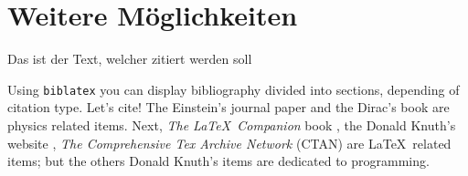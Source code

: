 \Author{\daAuthorOne}

\section{Weitere Möglichkeiten}

Das ist der Text, welcher zitiert werden soll \autocite[399]{einstein}

Using \texttt{biblatex} you can display bibliography divided into sections, 
depending of citation type. 
Let's cite! The Einstein's journal paper \autocite{einstein} and the Dirac's 
book \autocite{dirac} are physics related items. 
Next, \textit{The \LaTeX\ Companion} book \autocite{latexcompanion}, the Donald 
Knuth's website \autocite{knuthwebsite}, \textit{The Comprehensive Tex Archive 
Network} (CTAN) \autocite{ctan} are \LaTeX\ related items; but the others Donald 
Knuth's items \autocite{knuth-fa,knuth-acp} are dedicated to programming.

